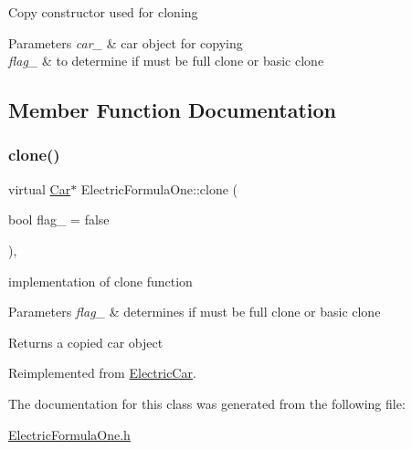 Copy constructor used for cloning 
\begin{DoxyParams}{Parameters}
{\em car\+\_\+} & car object for copying \\
\hline
{\em flag\+\_\+} & to determine if must be full clone or basic clone \\
\hline
\end{DoxyParams}


\subsection{Member Function Documentation}
\mbox{\label{class_electric_formula_one_ac1649c11b48ceae7a98ccbc0d4727e7c}} 
\subsubsection{\texorpdfstring{clone()}{clone()}}
{\footnotesize\ttfamily virtual \mbox{\hyperlink{class_car}{Car}}$\ast$ Electric\+Formula\+One\+::clone (\begin{DoxyParamCaption}\item[{bool}]{flag\+\_\+ = {\ttfamily false} }\end{DoxyParamCaption})\hspace{0.3cm}{\ttfamily [inline]}, {\ttfamily [virtual]}}

implementation of clone function 
\begin{DoxyParams}{Parameters}
{\em flag\+\_\+} & determines if must be full clone or basic clone \\
\hline
\end{DoxyParams}
\begin{DoxyReturn}{Returns}
a copied car object 
\end{DoxyReturn}


Reimplemented from \mbox{\hyperlink{class_electric_car_a852de7d2208dea4d45a554d9270508d0}{Electric\+Car}}.



The documentation for this class was generated from the following file\+:\begin{DoxyCompactItemize}
\item 
\mbox{\hyperlink{_electric_formula_one_8h}{Electric\+Formula\+One.\+h}}\end{DoxyCompactItemize}

